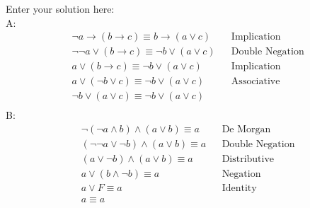 \documentclass[10pt]{exam}
\begin{document}
\begin{questions}

\begin{solution}
    Enter your solution here: \\
    A:
    \begin{align*}
        &\lnot a \rightarrow (b \rightarrow c) \equiv b \rightarrow (a \lor c)
        && \text{Implication} \\[2pt]
        &\lnot\lnot a \lor (b \rightarrow c) \equiv \lnot b \lor (a \lor c)
        && \text{Double Negation} \\[2pt]
        &a \lor (b \rightarrow c) \equiv \lnot b \lor (a \lor c)
        && \text{Implication} \\[2pt]
        &a \lor (\lnot b \lor c) \equiv \lnot b \lor (a \lor c)
        && \text{Associative} \\[2pt]
        &\lnot b \lor (a \lor c) \equiv \lnot b \lor (a \lor c)
        && \\[2pt]
    \end{align*}
    B:
    \begin{align*}
        &\lnot(\lnot a \land b) \land (a \lor b) \equiv a
        && \text{De Morgan} \\[2pt]
        &(\lnot\lnot a \lor \lnot b) \land (a \lor b) \equiv a
        && \text{Double Negation} \\[2pt]
        &(a \lor \lnot b) \land (a \lor b) \equiv a
        && \text{Distributive} \\[2pt]
        &a \lor (b \land \lnot b) \equiv a
        && \text{Negation} \\[2pt]
        &a \lor F \equiv a
        && \text{Identity} \\[2pt]
        &a \equiv a
        && \\[2pt]
    \end{align*}

\end{solution}

\end{questions}
\end{document}
